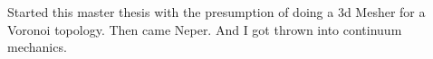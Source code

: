 \documentclass[preface.tex]{subfiles}
\begin{document}
Started this master thesis with the presumption of doing a 3d Mesher for a Voronoi topology. Then came Neper. And I got thrown into continuum mechanics.
\end{document}

